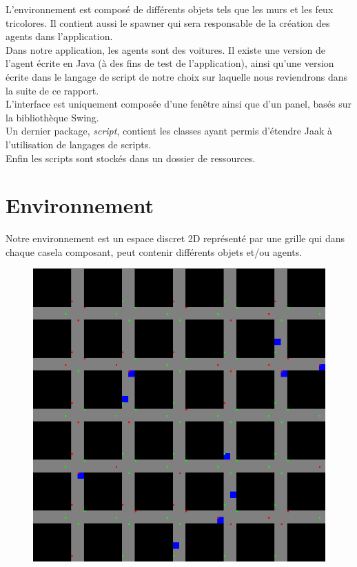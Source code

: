 \documentclass[a4paper,12pt]{report}
\begin{document}
L'environnement est composé de différents objets tels que les murs et les feux tricolores. Il contient aussi le spawner qui sera responsable de la création des agents dans l'application.\\

Dans notre application, les agents sont des voitures. Il existe une version de l'agent écrite en Java (à des fins de test de l'application), ainsi qu'une version écrite dans le langage de script de notre choix sur laquelle nous reviendrons dans la suite de ce rapport. \\

L'interface est uniquement composée d'une fenêtre ainsi que d'un panel, basés sur la bibliothèque Swing. \\

Un dernier package, \emph{script}, contient les classes ayant permis d'étendre Jaak à l'utilisation de langages de scripts. \\

Enfin les scripts sont stockés dans un dossier de ressources.

\section{Environnement}

Notre environnement est un espace discret 2D représenté par une grille qui dans chaque casela composant, peut contenir différents objets et/ou agents. \\

\begin{figure}[H]
   \centering
   \includegraphics[scale=0.35]{environnement.png}
\end{figure}
\end{document}
